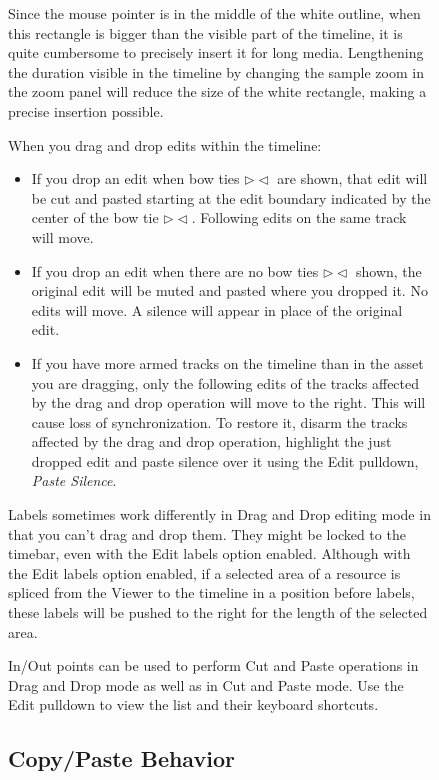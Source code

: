 \begin{figure}
Since the mouse pointer is in the middle of the white outline, when this rectangle is bigger than the visible part of the timeline, it is quite cumbersome to precisely insert it for long media. Lengthening the duration visible in the timeline by changing the sample zoom in the zoom panel will reduce the size of the white rectangle, making a precise insertion possible.

\noindent When you drag and drop edits within the timeline:

\begin{itemize}
    \item If you drop an edit when bow ties $\rhd\lhd$ are shown, that edit will be cut and pasted starting at the edit
    boundary indicated by the center of the bow tie $\rhd\lhd$.  Following edits on the same track will move.
    \item If you drop an edit when there are no bow ties $\rhd\lhd$ shown, the original edit will be muted and pasted
    where you dropped it. No edits will move. A silence will appear in place of the original edit.
    \item If you have more armed tracks on the timeline than in the asset you are dragging, only the following
    edits of the tracks affected by the drag and drop operation will move to the right. This will cause loss
    of synchronization. To restore it, disarm the tracks affected by the drag and drop operation, highlight
    the just dropped edit and paste silence over it using the Edit pulldown, \textit{Paste Silence}.
\end{itemize}

\noindent Labels sometimes work differently in Drag and Drop editing mode in that you can't drag and drop them. They might be locked to the timebar, even with the Edit labels option enabled.  Although with the Edit labels option enabled, if a selected area of a resource is spliced from the Viewer to the timeline in a position before labels, these labels will be pushed to the right for the length of the selected area.

In/Out points can be used to perform Cut and Paste operations in Drag and Drop mode as well as in Cut and Paste mode.  Use the Edit pulldown to view the list and their keyboard shortcuts.

\subsection{Copy/Paste Behavior}%
\label{sub:copy_paste_behavior}


\end{figure}
